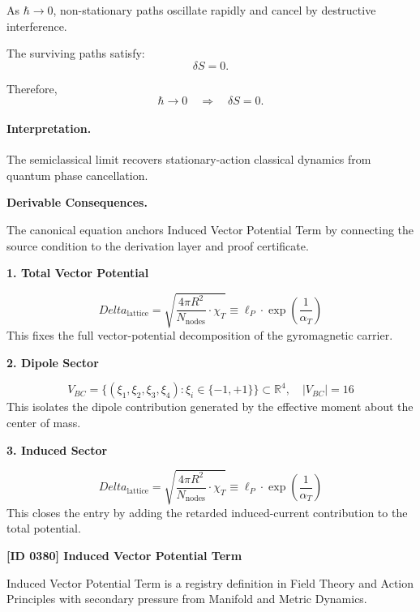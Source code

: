As $\hbar\to 0$, non-stationary paths oscillate rapidly and cancel by destructive interference.

The surviving paths satisfy:
\begin{equation}
\delta S=0 .
\end{equation}

Therefore,
\begin{equation}
\boxed{
\hbar\rightarrow 0
\quad\Longrightarrow\quad
\delta S=0 .
}
\end{equation}

\paragraph{Interpretation.}
The semiclassical limit recovers stationary-action classical dynamics from quantum phase cancellation.

\par\vspace{0.35em}
\noindent\textbf{Derivable Consequences.}\quad
\begingroup
\footnotesize
\raggedright
The canonical equation anchors Induced Vector Potential Term by connecting the source condition to the derivation layer and proof certificate.
\par\endgroup

\noindent\textbf{1. Total Vector Potential}\par
\[
Delta_{\text{lattice}} = \sqrt{\frac{4\pi R^2}{N_{\text{nodes}}} \cdot \chi_T} \equiv \ell_P \cdot \exp\left( \frac{1}{\alpha_T} \right)
\]
\noindent This fixes the full vector-potential decomposition of the gyromagnetic carrier.\par
\noindent\textbf{2. Dipole Sector}\par
\[
V_{BC} = \{ (\xi_1, \xi_2, \xi_3, \xi_4) : \xi_i \in \{ -1, +1 \} \} \subset \mathbb{R}^4, \quad |V_{BC}| = 16
\]
\noindent This isolates the dipole contribution generated by the effective moment about the center of mass.\par
\noindent\textbf{3. Induced Sector}\par
\[
Delta_{\text{lattice}} = \sqrt{\frac{4\pi R^2}{N_{\text{nodes}}} \cdot \chi_T} \equiv \ell_P \cdot \exp\left( \frac{1}{\alpha_T} \right)
\]
\noindent This closes the entry by adding the retarded induced-current contribution to the total potential.\par

\clearpage
\noindent\textbf{[ID 0380] Induced Vector Potential Term}\par
\vspace{0.35em}
\begingroup\small
{}
Induced Vector Potential Term is a registry definition in Field Theory and Action Principles with secondary pressure from Manifold and Metric Dynamics.

